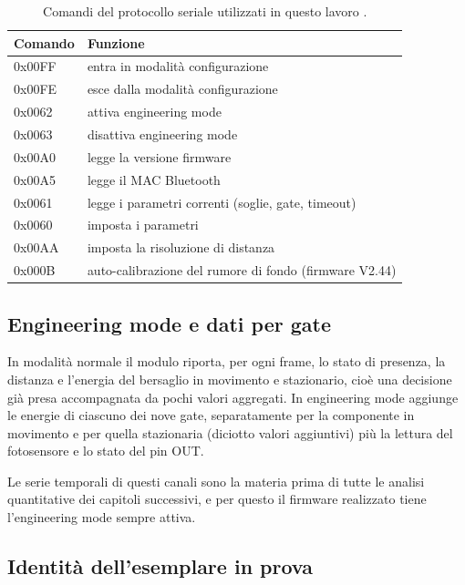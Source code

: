 \begin{table}[!htb]
\centering
\caption{Comandi del protocollo seriale utilizzati in questo lavoro \cite{hilinkProtoV107}.}
\label{tab:c3-5}
\small
\begin{tabularx}{\linewidth}{@{}lX@{}}
\toprule
\textbf{Comando} & \textbf{Funzione} \\
\midrule
0x00FF & entra in modalità configurazione \\
0x00FE & esce dalla modalità configurazione \\
0x0062 & attiva engineering mode \\
0x0063 & disattiva engineering mode \\
0x00A0 & legge la versione firmware \\
0x00A5 & legge il MAC Bluetooth \\
0x0061 & legge i parametri correnti (soglie, gate, timeout) \\
0x0060 & imposta i parametri \\
0x00AA & imposta la risoluzione di distanza \\
0x000B & auto-calibrazione del rumore di fondo (firmware V2.44) \\
\bottomrule
\end{tabularx}
\end{table}

\subsection{Engineering mode e dati per gate}
\label{sec:c3-1-5}

In modalità normale il modulo riporta, per ogni frame, lo stato di presenza, la distanza e l'energia del bersaglio in movimento e stazionario, cioè una decisione già presa accompagnata da pochi valori aggregati. In engineering mode aggiunge le energie di ciascuno dei nove gate, separatamente per la componente in movimento e per quella stazionaria (diciotto valori aggiuntivi) più la lettura del fotosensore e lo stato del pin OUT.

Le serie temporali di questi canali sono la materia prima di tutte le analisi quantitative dei capitoli successivi, e per questo il firmware realizzato tiene l’engineering mode sempre attiva.

\subsection{Identità dell'esemplare in prova}
\label{sec:c3-1-6}

